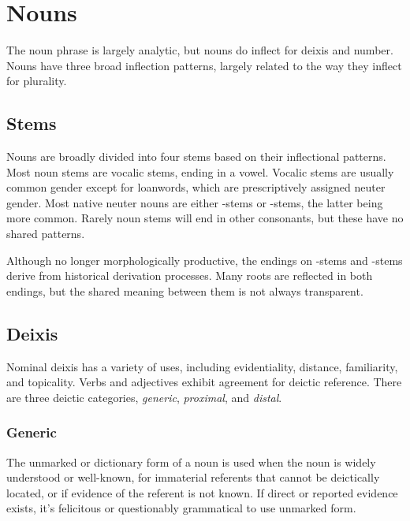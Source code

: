 \setchapterpreamble[u]{\margintoc}
\chapter{Nouns}
The \langname{} noun phrase is largely analytic, but nouns do inflect for deixis and number. Nouns have three broad inflection patterns, largely related to the way they inflect for plurality.

\section{Stems}
Nouns are broadly divided into four stems based on their inflectional patterns. Most noun stems are vocalic stems, ending in a vowel. Vocalic stems are usually common gender except for loanwords, which are prescriptively assigned neuter gender. Most native neuter nouns are either -stems or -stems, the latter being more common.  Rarely noun stems will end in other consonants, but these have no shared patterns.

Although no longer morphologically productive, the endings on -stems and -stems derive from historical derivation processes. Many roots are reflected in both endings, but the shared meaning between them is not always transparent.

\section{Deixis}
Nominal deixis has a variety of uses, including evidentiality, distance, familiarity, and topicality. Verbs and adjectives exhibit agreement for deictic reference. There are three deictic categories, \emph{generic}, \emph{proximal}, and \emph{distal}.

\subsection{Generic}
The unmarked or dictionary form of a noun is used when the noun is widely understood or well-known, for immaterial referents that cannot be deictically located, or if evidence of the referent is not known. If direct or reported evidence exists, it's felicitous or questionably grammatical to use unmarked form.

